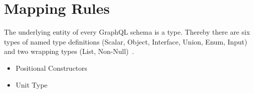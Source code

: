 
\newcommand{\li}[1]{\item \textcolor{black}{\textbf{#1}}:}


\section{Mapping Rules}

The underlying entity of every GraphQL schema is a type. 
Thereby there are six types of named type definitions 
(Scalar, Object, Interface, Union, Enum, Input) 
and two wrapping types (List, Non-Null)~\cite{gql-spec}. 

\begin{frame}
\begin{itemize}

  \item Positional Constructors
  

  \item Unit Type



\end{itemize}
\end{frame}

